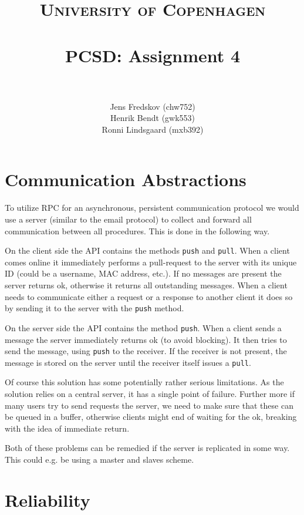 \documentclass[a4paper, 11pt]{article}
\title{ 
\normalfont \normalsize 
\textsc{University of Copenhagen} \\ [25pt]
\horrule{0.5pt} \\[0.4cm]
\huge PCSD: Assignment 4 \\
\horrule{2pt} \\[0.5cm]
}
\author{Jens Fredskov (chw752)\\Henrik Bendt (gwk553)\\Ronni Lindsgaard (mxb392)} %
\begin{document}
\maketitle
\pagebreak

\section{Communication Abstractions} %
\label{sec:communication_abstractions}

To utilize RPC for an asynchronous, persistent communication protocol we would use a server (similar to the email protocol) to collect and forward all communication between all procedures. This is done in the following way.

On the client side the API contains the methods \texttt{push} and \texttt{pull}. When a client comes online it immediately performs a pull-request to the server with its unique ID (could be a username, MAC address, etc.). If no messages are present the server returns ok, otherwise it returns all outstanding messages. When a client needs to communicate either a request or a response to another client it does so by sending it to the server with the \texttt{push} method.

On the server side the API contains the method \texttt{push}. When a client sends a message the server immediately returns ok (to avoid blocking). It then tries to send the message, using \texttt{push} to the receiver. If the receiver is not present, the message is stored on the server until the receiver itself issues a \texttt{pull}.

Of course this solution has some potentially rather serious limitations. As the solution relies on a central server, it has a single point of failure. Further more if many users try to send requests the server, we need to make sure that these can be queued in a buffer, otherwise clients might end of waiting for the ok, breaking with the idea of immediate return.

Both of these problems can be remedied if the server is replicated in some way. This could e.g. be using a master and slaves scheme.


\section{Reliability} %
\label{sec:reliability}
\end{document}
